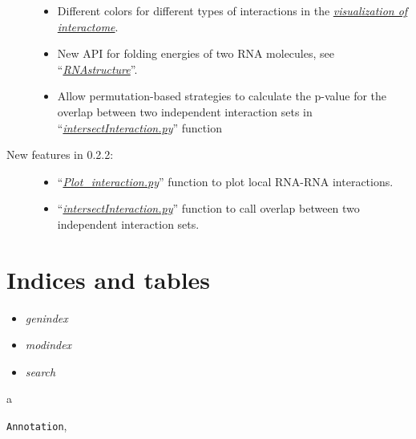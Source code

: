 \documentclass[letterpaper,10pt,english]{sphinxmanual}
\begin{document}
\begin{description}
\begin{itemize}
\item {} 
Different colors for different types of interactions in the {\hyperref[Visualization:visualizationglobal]{\emph{visualization of interactome}}}.

\item {} 
New API for folding energies of two RNA molecules, see ``{\hyperref[Other_api:rnafold]{\emph{RNAstructure}}}''.

\item {} 
Allow permutation-based strategies to calculate the p-value for the overlap between two independent interaction sets in ``{\hyperref[Analysis_pipeline:intersection]{\emph{intersectInteraction.py}}}'' function

\end{itemize}

\item[{New features in 0.2.2:}] \leavevmode\begin{itemize}
\item {} 
``{\hyperref[Visualization:plotinteraction]{\emph{Plot\_interaction.py}}}'' function to plot local RNA-RNA interactions.

\item {} 
``{\hyperref[Analysis_pipeline:intersection]{\emph{intersectInteraction.py}}}'' function to call overlap between two independent interaction sets.

\end{itemize}

\end{description}


\chapter{Indices and tables}
\label{index:indices-and-tables}\begin{itemize}
\item {} 
\emph{genindex}

\item {} 
\emph{modindex}

\item {} 
\emph{search}

\end{itemize}


\renewcommand{\indexname}{Python Module Index}
\begin{theindex}
\def\bigletter#1{{\Large\sffamily#1}\nopagebreak\vspace{1mm}}
\bigletter{a}
\item {\texttt{Annotation}}, \pageref{Other_api:module-Annotation}
\end{theindex}

\renewcommand{\indexname}{Index}
\printindex
\end{document}
